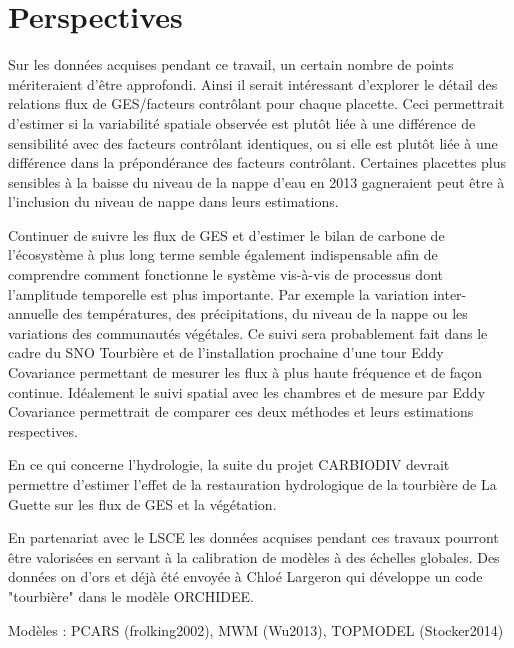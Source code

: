 \section*{Perspectives}

Sur les données acquises pendant ce travail, un certain nombre de points mériteraient d'être approfondi.
Ainsi il serait intéressant d'explorer le détail des relations flux de GES/facteurs contrôlant pour chaque placette.
Ceci permettrait d'estimer si la variabilité spatiale observée est plutôt liée à une différence de sensibilité avec des facteurs contrôlant identiques, ou si elle est plutôt liée à une différence dans la prépondérance des facteurs contrôlant.
Certaines placettes plus sensibles à la baisse du niveau de la nappe d'eau en 2013 gagneraient peut être à l'inclusion du niveau de nappe dans leurs estimations.

Continuer de suivre les flux de GES et d'estimer le bilan de carbone de l'écosystème à plus long terme semble également indispensable afin de comprendre comment fonctionne le système vis-à-vis de processus dont l'amplitude temporelle est plus importante.
Par exemple la variation inter-annuelle des températures, des précipitations, du niveau de la nappe ou les variations des communautés végétales.
Ce suivi sera probablement fait dans le cadre du SNO Tourbière et de l'installation prochaine d'une tour Eddy Covariance permettant de mesurer les flux à plus haute fréquence et de façon continue.
Idéalement le suivi spatial avec les chambres et de mesure par Eddy Covariance permettrait de comparer ces deux méthodes et leurs estimations respectives. 

En ce qui concerne l'hydrologie, la suite du projet CARBIODIV devrait permettre d'estimer l'effet de la restauration hydrologique de la tourbière de La Guette sur les flux de GES et la végétation.

En partenariat avec le LSCE les données acquises pendant ces travaux pourront être valorisées en servant à la calibration de modèles à des échelles globales.
Des données on d'ors et déjà été envoyée à Chloé Largeron qui développe un code "tourbière" dans le modèle ORCHIDEE.

Modèles : PCARS (frolking2002), MWM (Wu2013), TOPMODEL (Stocker2014)





